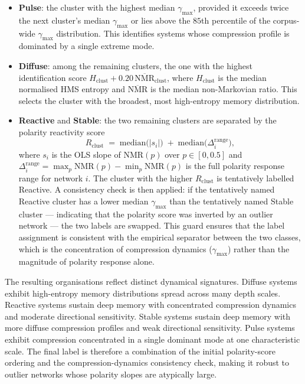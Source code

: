 \documentclass[aps,superscriptaddress,11pt]{revtex4-2}
\theoremstyle{definition}
\theoremstyle{plain}
\begin{document}
\begin{itemize}

\item \textbf{Pulse}: the cluster with the highest median $\gamma_{\max}$,
provided it exceeds twice the next cluster's median $\gamma_{\max}$ or
lies above the $85$th percentile of the corpus-wide $\gamma_{\max}$
distribution.  This identifies systems whose compression profile is
dominated by a single extreme mode.

\item \textbf{Diffuse}: among the remaining clusters, the one with the
highest identification score $H_{\mathrm{clust}} + 0.20\,
\overline{\mathrm{NMR}}_{\mathrm{clust}}$, where $H_{\mathrm{clust}}$ is
the median normalised HMS entropy and $\overline{\mathrm{NMR}}$ is the
median non-Markovian ratio.  This selects the cluster with the broadest,
most high-entropy memory distribution.

\item \textbf{Reactive} and \textbf{Stable}: the two remaining
clusters are separated by the polarity reactivity score
\[
R_{\mathrm{clust}}
\;=\;
\mathrm{median}\bigl(\lvert s_i\rvert\bigr)
\;+\;
\mathrm{median}\bigl(\Delta^{\mathrm{range}}_i\bigr),
\]
where $s_i$ is the OLS slope of $\mathrm{NMR}(p)$ over $p\in[0,0.5]$
and $\Delta^{\mathrm{range}}_i = \max_p \mathrm{NMR}(p) -
\min_p \mathrm{NMR}(p)$ is the full polarity response range for network
$i$.  The cluster with the higher $R_{\mathrm{clust}}$ is tentatively
labelled Reactive.  A consistency check is then applied: if the
tentatively named Reactive cluster has a lower median $\gamma_{\max}$
than the tentatively named Stable cluster --- indicating that the
polarity score was inverted by an outlier network --- the two labels are
swapped.  This guard ensures that the label assignment is consistent with
the empirical separator between the two classes, which is the concentration
of compression dynamics ($\gamma_{\max}$) rather than the magnitude of
polarity response alone.

\end{itemize}

The resulting organisations reflect distinct dynamical signatures.
Diffuse systems exhibit high-entropy memory distributions spread across
many depth scales.  Reactive systems sustain deep memory with concentrated
compression dynamics and moderate directional sensitivity.  Stable systems
sustain deep memory with more diffuse compression profiles and weak
directional sensitivity.  Pulse systems exhibit compression concentrated
in a single dominant mode at one characteristic scale.  The final label
is therefore a combination of the initial polarity-score ordering and the
compression-dynamics consistency check, making it robust to outlier
networks whose polarity slopes are atypically large.
\end{document}

